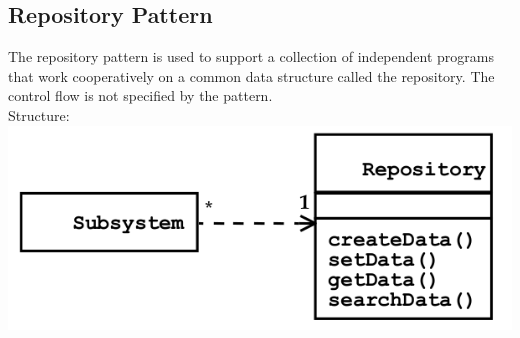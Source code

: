 \subsection{Repository Pattern}
The repository pattern is used to support a collection of independent programs that work cooperatively on a common data structure called the repository.
The control flow is not specified by the pattern.\\
Structure:\\
\includegraphics[width=.75\linewidth]{images/pattern_repository.png}
\newpage

